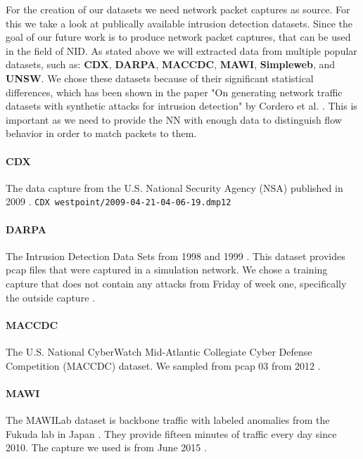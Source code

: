 \documentclass[
	ngerman,
	ruledheaders=section,%
	class=report,%
	thesis={type=bachelor},%
	accentcolor=9c,%
	custommargins=true,%
	marginpar=false,%
	parskip=half-,%
	fontsize=11pt,%
]{tudapub}
\let\code\texttt
\begin{document}
For the creation of our datasets we need network packet captures as source.
For this we take a look at publically available intrusion detection datasets.
Since the goal of our future work is to produce network packet captures, that can be used in the field of NID.
As stated above we will extracted data from multiple popular datasets, such as: \textbf{CDX}, \textbf{DARPA}, \textbf{MACCDC}, \textbf{MAWI}, \textbf{Simpleweb}, and \textbf{UNSW}.
We chose these datasets because of their significant statistical differences, which has been shown in the paper "On generating network traffic datasets with synthetic attacks for intrusion detection" by Cordero et al. \cite{corderoGeneratingNetworkTraffic2019}.
This is important as we need to provide the NN with enough data to distinguish flow behavior in order to match packets to them.

\paragraph{CDX} The data capture from the U.S. National Security Agency (NSA) published in 2009 \cite{CyberResearchCenter}.
\code{CDX westpoint/2009-04-21-04-06-19.dmp12}

\paragraph{DARPA} The Intrusion Detection Data Sets from 1998 and 1999 \cite{1999DARPAIntrusion}.
This dataset provides pcap files that were captured in a simulation network.
We chose a training capture that does not contain any attacks from Friday of week one, specifically the outside capture \cite{MITLincolnLaboratory}.

\paragraph{MACCDC} The U.S. National CyberWatch Mid-Atlantic Collegiate Cyber Defense Competition (MACCDC) dataset.
We sampled from pcap 03 from 2012 \cite{PCAPFilesUS}.

\paragraph{MAWI} The MAWILab dataset is backbone traffic with labeled anomalies from the Fukuda lab in Japan \cite{MAWILabHome}.
They provide fifteen minutes of traffic every day since 2010. The capture we used is from June 2015 \cite{MAWILabDataSeta}.
\end{document}
